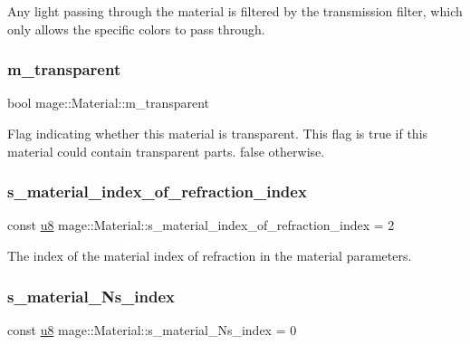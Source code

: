 Any light passing through the material is filtered by the transmission filter, which only allows the specific colors to pass through. \hypertarget{structmage_1_1_material_abaaf4666e33f4a7952ef9d0801e3f199}{}\label{structmage_1_1_material_abaaf4666e33f4a7952ef9d0801e3f199} 
\subsubsection{\texorpdfstring{m\+\_\+transparent}{m\_transparent}}
{\footnotesize\ttfamily bool mage\+::\+Material\+::m\+\_\+transparent\hspace{0.3cm}{\ttfamily [private]}}

Flag indicating whether this material is transparent. This flag is {\ttfamily true} if this material could contain transparent parts. {\ttfamily false} otherwise. \hypertarget{structmage_1_1_material_a57b78f39bb27d8081b5db64d6026867f}{}\label{structmage_1_1_material_a57b78f39bb27d8081b5db64d6026867f} 
\subsubsection{\texorpdfstring{s\+\_\+material\+\_\+index\+\_\+of\+\_\+refraction\+\_\+index}{s\_material\_index\_of\_refraction\_index}}
{\footnotesize\ttfamily const \hyperlink{namespacemage_a5a362e2d56fc439362a80516ecae7828}{u8} mage\+::\+Material\+::s\+\_\+material\+\_\+index\+\_\+of\+\_\+refraction\+\_\+index = 2\hspace{0.3cm}{\ttfamily [static]}}

The index of the material index of refraction in the material parameters. \hypertarget{structmage_1_1_material_a8f040a08a0047bb9b25786667b18e55b}{}\label{structmage_1_1_material_a8f040a08a0047bb9b25786667b18e55b} 
\subsubsection{\texorpdfstring{s\+\_\+material\+\_\+\+Ns\+\_\+index}{s\_material\_Ns\_index}}
{\footnotesize\ttfamily const \hyperlink{namespacemage_a5a362e2d56fc439362a80516ecae7828}{u8} mage\+::\+Material\+::s\+\_\+material\+\_\+\+Ns\+\_\+index = 0\hspace{0.3cm}{\ttfamily [static]}}

